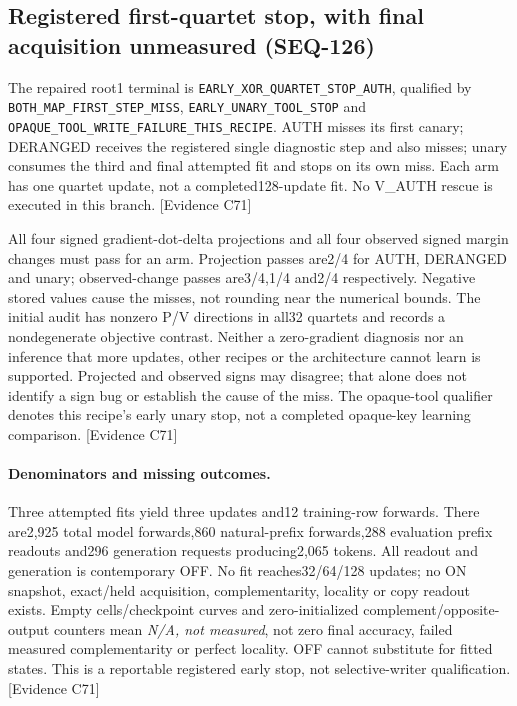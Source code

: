 \documentclass[11pt]{article}
\newcommand{\ev}[1]{\textsf{[Evidence #1]}}
\begin{document}
\subsection{Registered first-quartet stop, with final acquisition unmeasured (SEQ-126)}
The repaired root1 terminal is
\texttt{EARLY\_XOR\_QUARTET\_STOP\_AUTH}, qualified by
\texttt{BOTH\_MAP\_FIRST\_STEP\_MISS},
\texttt{EARLY\_UNARY\_TOOL\_STOP} and
\texttt{OPAQUE\_TOOL\_WRITE\_FAILURE\_THIS\_RECIPE}.
AUTH misses its first canary; DERANGED receives the registered single diagnostic
step and also misses; unary consumes the third and final attempted fit and stops
on its own miss. Each arm has one quartet update, not a completed128-update fit.
No V\_AUTH rescue is executed in this branch. \ev{C71}

All four signed gradient-dot-delta projections and all four observed signed
margin changes must pass for an arm. Projection passes are2/4 for AUTH, DERANGED
and unary; observed-change passes are3/4,1/4 and2/4 respectively. Negative stored
values cause the misses, not rounding near the numerical bounds. The initial
audit has nonzero P/V directions in all32 quartets and records a nondegenerate
objective contrast. Neither a zero-gradient diagnosis nor an inference that
more updates, other recipes or the architecture cannot learn is supported.
Projected and observed signs may disagree; that alone does not identify a sign
bug or establish the cause of the miss. The opaque-tool qualifier denotes this
recipe's early unary stop, not a completed opaque-key learning comparison.
\ev{C71}

\paragraph{Denominators and missing outcomes.}
Three attempted fits yield three updates and12 training-row forwards. There
are2,925 total model forwards,860 natural-prefix forwards,288 evaluation prefix
readouts and296 generation requests producing2,065 tokens. All readout and
generation is contemporary OFF. No fit reaches32/64/128 updates; no ON snapshot,
exact/held acquisition, complementarity, locality or copy readout exists. Empty
cells/checkpoint curves and zero-initialized complement/opposite-output counters
mean \emph{N/A, not measured}, not zero final accuracy, failed measured
complementarity or perfect locality. OFF cannot substitute for fitted states.
This is a reportable registered early stop, not selective-writer qualification.
\ev{C71}
\end{document}
